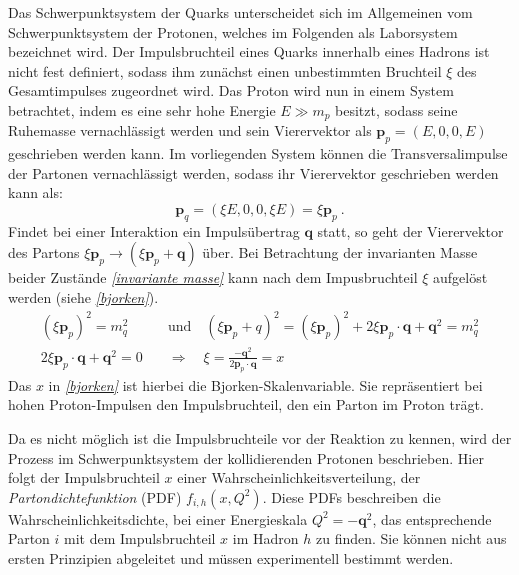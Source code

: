 Das Schwerpunktsystem der Quarks unterscheidet sich im Allgemeinen vom Schwerpunktsystem der Protonen, welches im Folgenden als Laborsystem bezeichnet wird. Der Impulsbruchteil eines Quarks innerhalb eines Hadrons ist nicht fest definiert, sodass ihm zunächst einen unbestimmten Bruchteil $\xi$ des Gesamtimpulses zugeordnet wird. Das Proton wird nun in einem System betrachtet, indem es eine sehr hohe Energie  $E \gg m_p$ besitzt, sodass seine Ruhemasse vernachlässigt werden und sein Vierervektor als $\textbf{p}_p = (E, 0, 0, E)$ geschrieben werden kann. Im vorliegenden System können die Transversalimpulse der Partonen vernachlässigt werden, sodass ihr Vierervektor geschrieben werden kann als:
\begin{equation}
\textbf{p}_q = (\xi E, 0, 0, \xi E) = \xi \textbf{p}_p ~.
\end{equation}
Findet bei einer Interaktion ein Impulsübertrag $\textbf{q}$ statt, so geht der Vierervektor des Partons $\xi \textbf{p}_p \rightarrow (\xi \textbf{p}_p + \textbf{q})$ über. Bei Betrachtung der invarianten Masse beider Zustände \textit{\autoref{invariante masse}} kann nach dem Impusbruchteil $\xi$ aufgelöst werden (siehe \textit{\autoref{bjorken}}).
\begin{align}
\left(\xi \textbf{p}_p\right)^2 = m_q^2 \quad &\text{und} \quad \left(\xi \textbf{p}_p + q\right)^2 = \left(\xi \textbf{p}_p\right)^2 + 2\xi \textbf{p}_p \cdot \textbf{q} + \textbf{q}^2 = m_q^2
\label{invariante masse} \\
2\xi \textbf{p}_p \cdot \textbf{q} + \textbf{q}^2 = 0 \quad &\Rightarrow \quad \xi = \frac{-\textbf{q}^2}{2\textbf{p}_p\cdot \textbf{q}} = x
\label{bjorken}
\end{align}
Das $x$ in \textit{\autoref{bjorken}} ist hierbei die Bjorken-Skalenvariable. Sie repräsentiert bei hohen Proton-Impulsen den Impulsbruchteil, den ein Parton im Proton trägt. 

Da es nicht möglich ist die Impulsbruchteile vor der Reaktion zu kennen, wird der Prozess im Schwerpunktsystem der kollidierenden Protonen beschrieben. Hier folgt der Impulsbruchteil $x$ einer Wahrscheinlichkeitsverteilung, der \textit{Partondichtefunktion} (PDF) $f_{i,h}(x, Q^2)$. Diese PDFs beschreiben die Wahrscheinlichkeitsdichte, bei einer Energieskala $Q^2 = -\textbf{q}^2$, das entsprechende Parton $i$ mit dem Impulsbruchteil $x$ im Hadron $h$ zu finden. Sie können nicht aus ersten Prinzipien abgeleitet und müssen experimentell bestimmt werden. 

